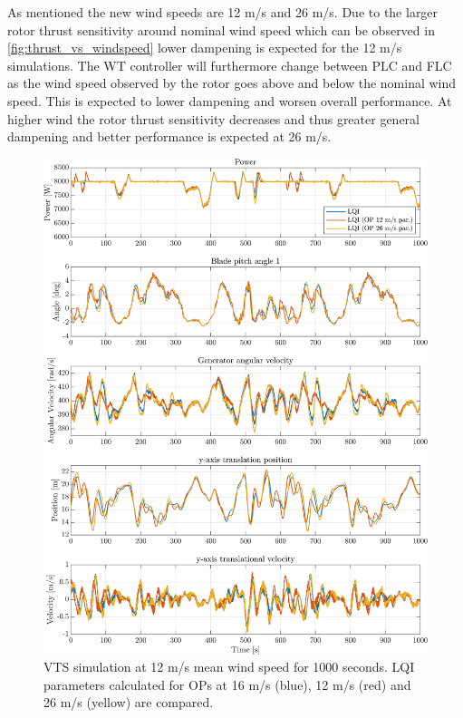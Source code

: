 As mentioned the new wind speeds are 12 m/s and 26 m/s. Due to the larger rotor thrust sensitivity around nominal wind speed which can be observed in \cref{fig:thrust_vs_windspeed} lower dampening is expected for the 12 m/s simulations. The WT controller will furthermore change between PLC and FLC as the wind speed observed by the rotor goes above and below the nominal wind speed. This is expected to lower dampening and worsen overall performance. At higher wind the rotor thrust sensitivity decreases and thus greater general dampening and better performance is expected at 26 m/s.
\begin{figure}[ht]
	\centering
	\includegraphics[width=0.7\linewidth]{Graphics/TestResults/VTSplotting/20_pow_th_w_py_vy.png}
	\caption{VTS simulation at 12 m/s mean wind speed for 1000 seconds. LQI parameters calculated for OPs at 16 m/s (blue), 12 m/s (red) and 26 m/s (yellow) are compared.}
	\label{fig:vts_20_pow_th_w_py_vy}
\end{figure}
